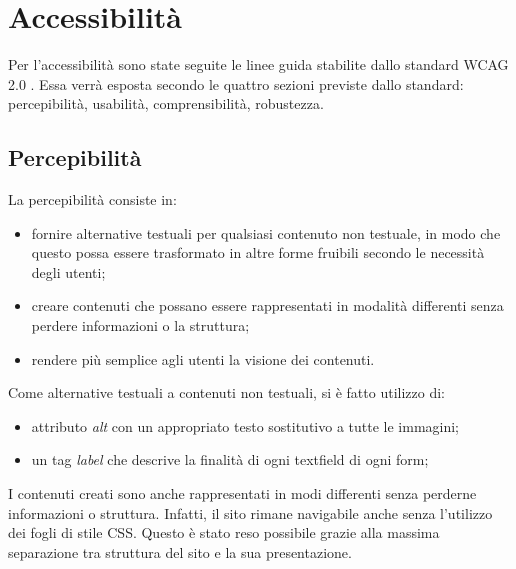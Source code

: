 	\section{Accessibilità}
	Per l'accessibilità sono state seguite le linee guida stabilite dallo standard WCAG 2.0 . Essa verrà esposta secondo le quattro sezioni previste dallo standard: percepibilità, usabilità, comprensibilità, robustezza.
	\subsection{Percepibilità}
	La percepibilità consiste in: 
	\begin{itemize}
		\item fornire alternative testuali per qualsiasi contenuto non testuale, in modo che questo possa essere trasformato in altre forme fruibili secondo le necessità degli utenti;
		\item creare contenuti che possano essere rappresentati in modalità differenti senza perdere informazioni o la struttura;
		\item rendere più semplice agli utenti la visione dei contenuti.
	\end{itemize}
	Come alternative testuali a contenuti non testuali, si è fatto utilizzo di:
	\begin{itemize}
		\item attributo \textit{alt} con un appropriato testo sostitutivo a tutte le immagini;
		\item un tag \textit{label} che descrive la finalità di ogni textfield di ogni form;
	\end{itemize}
	I contenuti creati sono anche rappresentati in modi differenti senza perderne informazioni o struttura. Infatti, il sito rimane navigabile anche senza l'utilizzo dei fogli di stile CSS. Questo è stato reso possibile grazie alla massima separazione tra struttura del sito e la sua presentazione.
